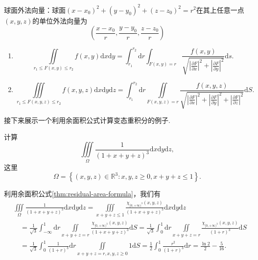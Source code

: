 球面外法向量：球面$(x-x_0)^2+(y-y_0)^2+(z-z_0)^2=r^2$在其上任意一点$(x,y,z)$的单位外法向量为
\[
    \left(\frac{x-x_0}{r},\frac{y-y_0}{r},\frac{z-z_0}{r}\right)
\]
\begin{theorem}[余面积公式]\label{thm:residual-area-formula}
    \begin{enumerate}
        \item \[\iint\limits_{r_1 \leqslant F(x, y) \leqslant r_2} f(x, y) \mathrm{d} x \mathrm{d} y=\int_{r_1}^{r_2} \mathrm{d} r \int_{F(x, y)=r} \frac{f(x, y)}{\sqrt{\left|\frac{\partial F}{\partial x}\right|^2+\left|\frac{\partial F}{\partial y}\right|^2}} \mathrm{d} s .\]
        \item \[\iiint\limits_{r_1 \leqslant F(x, y, z) \leqslant r_2} f(x, y, z) \mathrm{d} x \mathrm{d} y \mathrm{d} z=\int_{r_1}^{r_2} \mathrm{d} r \iint\limits_{F(x, y, z)=r} \frac{f(x, y, z)}{\sqrt{\left|\frac{\partial F}{\partial x}\right|^2+\left|\frac{\partial F}{\partial y}\right|^2+\left|\frac{\partial F}{\partial z}\right|^2}} \mathrm{d} S .\]
    \end{enumerate}
\end{theorem}

接下来展示一个利用余面积公式计算变态重积分的例子.

\begin{exercise}
计算
$$
\iiint\limits_{\Omega} \frac{1}{(1+x+y+z)^3} \mathrm{d} x \mathrm{d} y \mathrm{d} z,
$$
这里
$$
\Omega=\left\{(x, y, z) \in \mathbb{R}^3: x, y, z \geqslant 0, x+y+z \leqslant 1\right\} .
$$
\end{exercise}

\begin{solution}
    利用余面积公式\ref{thm:residual-area-formula}，我们有
{\small
$$
\begin{aligned}
& \iiint\limits_{\Omega} \frac{1}{(1+x+y+z)^3} \mathrm{d} x \mathrm{d} y \mathrm{d} z=\iiint\limits_{x+y+z \leqslant 1} \frac{\chi_{[0,+\infty)^3}(x, y, z)}{(1+x+y+z)^3} \mathrm{d} x \mathrm{d} y \mathrm{d} z \\
& \quad=\frac{1}{\sqrt{3}} \int_{-\infty}^1 \mathrm{d} r \iint\limits_{x+y+z=r} \frac{\chi_{[0,+\infty)^3}(x, y, z)}{(1+x+y+z)^3} \mathrm{d} S=\frac{1}{\sqrt{3}} \int_0^1 \mathrm{d} r \iint\limits_{x+y+z=r} \frac{\chi_{[0,+\infty)^3}(x, y, z)}{(1+r)^3} \mathrm{d} S \\
& \quad=\frac{1}{\sqrt{3}} \int_0^1 \frac{1}{(1+r)^3} \mathrm{d} r \iint\limits_{x+y+z=r, x, y, z \geqslant 0} 1 \mathrm{d} S=\frac{1}{2} \int_0^1 \frac{r^2}{(1+r)^3} \mathrm{d} r=\frac{\ln 2}{2}-\frac{5}{16} .
\end{aligned}
$$
}
\end{solution}

